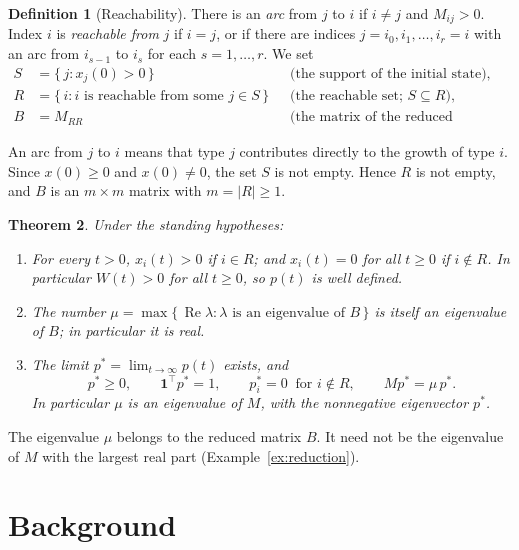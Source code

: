 \documentclass[11pt]{article}
\newtheorem{theorem}{Theorem}
\theoremstyle{definition}
\newtheorem{definition}[theorem]{Definition}
\theoremstyle{remark}
\newcommand{\one}{\mathbf{1}}
\newcommand{\T}{\top}
\renewcommand{\Re}{\operatorname{Re}}
\begin{document}
\begin{definition}[Reachability]\label{def:reach}
There is an \emph{arc} from $j$ to $i$ if $i \ne j$ and $M_{ij} > 0$. Index $i$ is
\emph{reachable from} $j$ if $i = j$, or if there are indices $j = i_0, i_1, \dots, i_r = i$ with
an arc from $i_{s-1}$ to $i_s$ for each $s = 1,\dots,r$. We set
\begin{align*}
  S &= \{\, j : x_j(0) > 0 \,\} && \text{(the support of the initial state),}\\
  R &= \{\, i : i \text{ is reachable from some } j \in S \,\} && \text{(the reachable set; } S \subseteq R\text{),}\\
  B &= M_{RR} && \text{(the matrix of the reduced system).}
\end{align*}
\end{definition}

An arc from $j$ to $i$ means that type $j$ contributes directly to the growth of type $i$.
Since $x(0) \ge 0$ and $x(0) \ne 0$, the set $S$ is not empty. Hence $R$ is not empty, and $B$ is
an $m \times m$ matrix with $m = |R| \ge 1$.

\begin{theorem}\label{thm:main}
Under the standing hypotheses:
\begin{enumerate}
  \item\label{thm:main:support} For every $t > 0$, $x_i(t) > 0$ if $i \in R$; and $x_i(t) = 0$ for
        all $t \ge 0$ if $i \notin R$. In particular $W(t) > 0$ for all $t \ge 0$, so $p(t)$ is
        well defined.
  \item\label{thm:main:mu} The number
        $\mu = \max\{\, \Re\lambda : \lambda \text{ is an eigenvalue of } B \,\}$
        is itself an eigenvalue of $B$; in particular it is real.
  \item\label{thm:main:limit} The limit $p^* = \lim_{t \to \infty} p(t)$ exists, and
        \[
          p^* \ge 0, \qquad \one^\T p^* = 1, \qquad p^*_i = 0 \ \text{ for } i \notin R,
          \qquad M p^* = \mu\, p^* .
        \]
        In particular $\mu$ is an eigenvalue of $M$, with the nonnegative eigenvector $p^*$.
\end{enumerate}
\end{theorem}

The eigenvalue $\mu$ belongs to the reduced matrix $B$. It need not be the eigenvalue of $M$ with
the largest real part (Example~\ref{ex:reduction}).

\section{Background}\label{sec:background}
\end{document}
